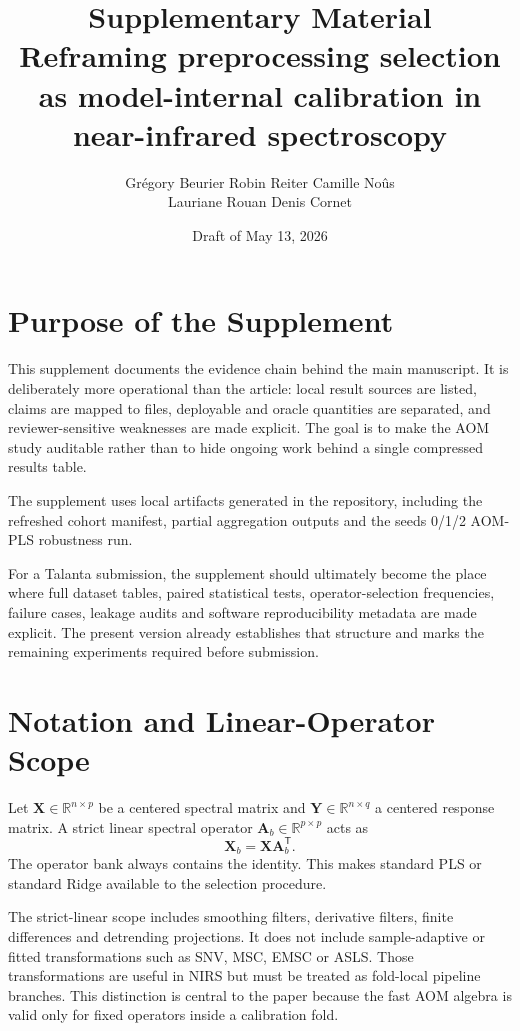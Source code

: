 \documentclass[11pt,a4paper]{article}
\title{\textbf{Supplementary Material}\\
Reframing preprocessing selection as model-internal calibration in near-infrared spectroscopy}
\author{
Gr{\'e}gory Beurier \quad Robin Reiter \quad Camille No{\^u}s\\[0.35em]
Lauriane Rouan \quad Denis Cornet
}
\date{Draft of May 13, 2026}
\newcommand{\X}{\mathbf{X}}
\newcommand{\Y}{\mathbf{Y}}
\newcommand{\A}{\mathbf{A}}
\newcommand{\transpose}{^{\mathsf T}}
\begin{document}
\maketitle

\tableofcontents

\section{Purpose of the Supplement}

This supplement documents the evidence chain behind the main manuscript.  It
is deliberately more operational than the article: local result sources are
listed, claims are mapped to files, deployable and oracle quantities are
separated, and reviewer-sensitive weaknesses are made explicit.  The goal is
to make the AOM study auditable rather than to hide ongoing work behind a
single compressed results table.

The supplement uses local artifacts generated in the repository, including the
refreshed cohort manifest, partial aggregation outputs and the seeds 0/1/2
AOM-PLS robustness run.

For a Talanta submission, the supplement should ultimately become the place
where full dataset tables, paired statistical tests, operator-selection
frequencies, failure cases, leakage audits and software reproducibility
metadata are made explicit.  The present version already establishes that
structure and marks the remaining experiments required before submission.

\section{Notation and Linear-Operator Scope}

Let $\X\in\mathbb{R}^{n\times p}$ be a centered spectral matrix and
$\Y\in\mathbb{R}^{n\times q}$ a centered response matrix.  A strict linear
spectral operator $\A_b\in\mathbb{R}^{p\times p}$ acts as
\begin{equation}
  \X_b = \X\A_b\transpose .
\end{equation}
The operator bank always contains the identity.  This makes standard PLS or
standard Ridge available to the selection procedure.

The strict-linear scope includes smoothing filters, derivative filters,
finite differences and detrending projections.  It does not include
sample-adaptive or fitted transformations such as SNV, MSC, EMSC or ASLS.
Those transformations are useful in NIRS but must be treated as fold-local
pipeline branches.  This distinction is central to the paper because the fast
AOM algebra is valid only for fixed operators inside a calibration fold.
\end{document}
